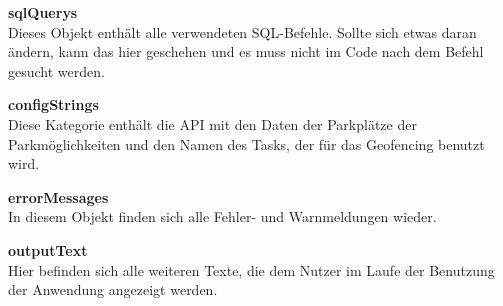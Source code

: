 \begin{description}
	\item \textbf{sqlQuerys} \\ Dieses Objekt enthält alle verwendeten SQL-Befehle. Sollte sich etwas daran ändern, kann das hier geschehen und es muss nicht im Code nach dem Befehl gesucht werden.
	\item \textbf{configStrings} \\ Diese Kategorie enthält die API mit den Daten der Parkplätze der Parkmöglichkeiten und den Namen des Tasks, der für das Geofencing benutzt wird.
	\item \textbf{errorMessages} \\ In diesem Objekt finden sich alle Fehler- und Warnmeldungen wieder.
	\item \textbf{outputText} \\ Hier befinden sich alle weiteren Texte, die dem Nutzer im Laufe der Benutzung der Anwendung angezeigt werden.
\end{description}